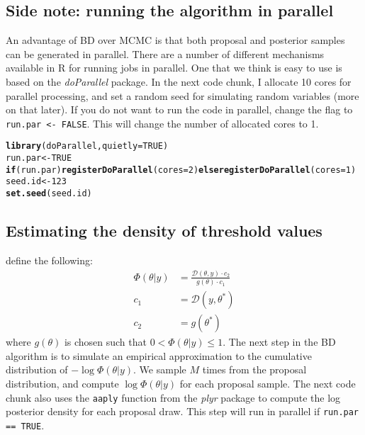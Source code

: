 \documentclass[10pt]{article}\usepackage[]{graphicx}\usepackage[]{color}
\makeatletter
\newcommand{\hlnum}[1]{\textcolor[rgb]{0.686,0.059,0.569}{#1}}%
\newcommand{\hlstd}[1]{\textcolor[rgb]{0.345,0.345,0.345}{#1}}%
\newcommand{\hlkwa}[1]{\textcolor[rgb]{0.161,0.373,0.58}{\textbf{#1}}}%
\newcommand{\hlkwb}[1]{\textcolor[rgb]{0.69,0.353,0.396}{#1}}%
\newcommand{\hlkwc}[1]{\textcolor[rgb]{0.333,0.667,0.333}{#1}}%
\newcommand{\hlkwd}[1]{\textcolor[rgb]{0.737,0.353,0.396}{\textbf{#1}}}%
\newenvironment{kframe}{%
 \def\at@end@of@kframe{}%
 \ifinner\ifhmode%
  \def\at@end@of@kframe{\end{minipage}}%
  \begin{minipage}{\columnwidth}%
 \fi\fi%
 \def\FrameCommand##1{\hskip\@totalleftmargin \hskip-\fboxsep
 \colorbox{shadecolor}{##1}\hskip-\fboxsep
     \hskip-\linewidth \hskip-\@totalleftmargin \hskip\columnwidth}%
 \MakeFramed {\advance\hsize-\width
   \@totalleftmargin\z@ \linewidth\hsize
   \@setminipage}}%
 {\par\unskip\endMakeFramed%
 \at@end@of@kframe}
\newenvironment{knitrout}{}{} %
\renewenvironment{knitrout}{\begin{singlespace}}{\end{singlespace}}
\newcommand{\pkg}[1]{\emph{#1}}
\newcommand{\proglang}[1]{\textsf{#1}}
\newcommand{\func}[1]{\texttt{#1}}
\newcommand{\code}[1]{\texttt{#1}}
\newcommand{\Gtheta}{g(\theta)}
\newcommand{\Phitheta}{\Phi(\theta|y)}
\newcommand{\Dy}{\mathcal{D}(\theta,y)}
\makeatother
\begin{document}
\subsection{Side note:  running the algorithm in parallel}

An advantage of BD over MCMC is that both proposal and posterior
samples can be generated in parallel.  There are a number of different
mechanisms available in \proglang{R} for running jobs in parallel.  One that we
think is easy to use is based on the \pkg{doParallel} package.  In the
next code chunk, I allocate 10 cores for parallel processing, and set
a random seed for simulating random variables (more on that later).
If you do not want to run the code in parallel, change the flag to
\code{run.par <- FALSE}.  This will change the number of allocated
cores to 1.

\begin{knitrout}
\color{fgcolor}\begin{kframe}
\begin{alltt}
\hlkwd{library}\hlstd{(doParallel,} \hlkwc{quietly}\hlstd{=}\hlnum{TRUE}\hlstd{)}
\hlstd{run.par} \hlkwb{<-} \hlnum{TRUE}
\hlkwa{if}\hlstd{(run.par)} \hlkwd{registerDoParallel}\hlstd{(}\hlkwc{cores}\hlstd{=}\hlnum{2}\hlstd{)} \hlkwa{else} \hlkwd{registerDoParallel}\hlstd{(}\hlkwc{cores}\hlstd{=}\hlnum{1}\hlstd{)}
\hlstd{seed.id} \hlkwb{<-} \hlnum{123}
\hlkwd{set.seed}\hlstd{(seed.id)}
\end{alltt}
\end{kframe}
\end{knitrout}




\subsection{Estimating the density of threshold values}
 define the following:
\begin{align}
  \label{eq:logPhi}
  \Phitheta&=\displaystyle\frac{\Dy\cdot c_2}{\Gtheta \cdot c_1}\\
  c_1&=\mathcal{D}(y,\theta^*)\\
  c_2&=g(\theta^*)
\end{align}
where $\Gtheta$ is chosen such that $0 < \Phitheta \leq 1$.  The next step in the BD algorithm is to simulate an empirical
approximation to the cumulative distribution of $-\log\Phi(\theta|y)$.  We sample $M$
times from the proposal distribution, and compute
$\log\Phi(\theta|y)$ for each proposal sample.  The next code chunk
also uses the \func{aaply} function from the \pkg{plyr} package to compute
the log posterior density for each proposal draw.  This step will run in parallel if
\code{run.par == TRUE}.
\end{document}
